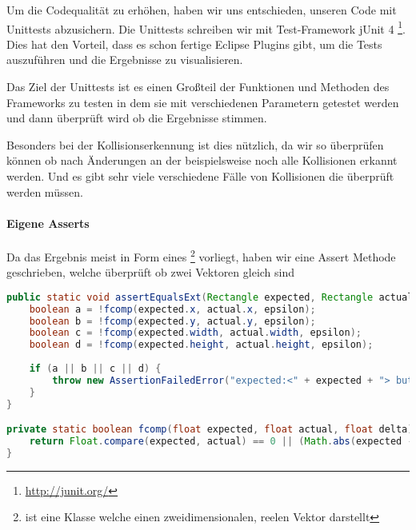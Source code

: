 
Um die Codequalität zu erhöhen, haben wir uns entschieden, unseren Code mit Unittests abzusichern.
Die Unittests schreiben wir mit Test-Framework jUnit 4 \footnote{\url{http://junit.org/}}. Dies hat den Vorteil, dass es schon fertige Eclipse Plugins gibt, um die Tests auszuführen und die Ergebnisse zu visualisieren.


Das Ziel der Unittests ist es einen Großteil der Funktionen und Methoden des Frameworks zu testen in dem sie mit verschiedenen Parametern getestet werden und dann überprüft wird ob die Ergebnisse stimmen. \cite[S 62]{JUNIT}

Besonders bei der Kollisionserkennung ist dies nützlich, da wir so überprüfen können ob nach Änderungen an der  beispielsweise noch alle Kollisionen erkannt werden. Und es gibt sehr viele verschiedene Fälle von Kollisionen die überprüft werden müssen.

\paragraph{Eigene Asserts}

Da das Ergebnis meist in Form eines \footnote{ ist eine Klasse welche einen zweidimensionalen, reelen Vektor darstellt} vorliegt, haben wir eine Assert Methode geschrieben, welche überprüft ob zwei Vektoren gleich sind

\doinline
\begin{lstlisting}[caption=Eine Assert Methode für zwei Vektoren, title=\hspace{0 pt}, language=java]
public static void assertEqualsExt(Rectangle expected, Rectangle actual, float epsilon) {
	boolean a = !fcomp(expected.x, actual.x, epsilon);
	boolean b = !fcomp(expected.y, actual.y, epsilon);
	boolean c = !fcomp(expected.width, actual.width, epsilon);
	boolean d = !fcomp(expected.height, actual.height, epsilon);
	
	if (a || b || c || d) {
		throw new AssertionFailedError("expected:<" + expected + "> but was:<" + actual + ">" );
	}
}

private static boolean fcomp(float expected, float actual, float delta) {
	return Float.compare(expected, actual) == 0 || (Math.abs(expected - actual) <= delta);
}
\end{lstlisting}

